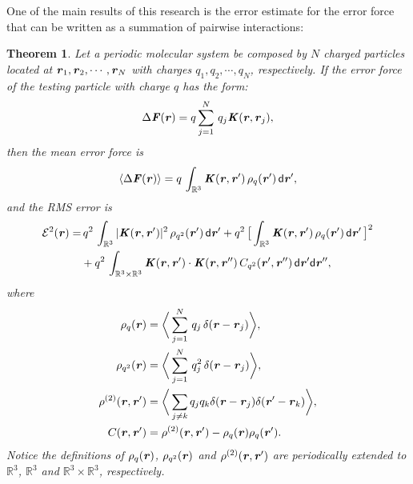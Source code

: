 \documentclass[aps,pre,preprint,unsortedaddress]{revtex4}
\renewcommand{\v}[1]{\textbf{\textit{#1}}}
\renewcommand{\d}[1]{\textsf{#1}}
\newtheorem{theorem}{Theorem}[section]
\begin{document}
One of the main results of this research is the error estimate for
the error force that can be written as a summation of
pairwise interactions:
\begin{theorem}\label{thm:tmp1}
  Let a periodic molecular system be composed by $N$ charged particles
  located at $\v r_1, \v r_2, \cdots, \v r_N$ with charges $q_1, q_2,
  \cdots, q_N$, respectively.
  If the error force of the testing particle with charge $q$ has the form:
  \begin{align}\label{eqn:thm-error-force}
    \Delta \v F(\v r) =
    q\sum_{j=1}^N\,q_j \v K(\v r, \v r_j),
  \end{align}
  then the mean error force is
  \begin{align}\label{eqn:thm-meanf}
    \langle\Delta\v F(\v r)\rangle
    =q\, \int_{\mathbb R^3}\v K (\v r,\v r')\,\rho_q(\v r')\,\d d\v r',
  \end{align}
  and the RMS error is
  \begin{align}\nonumber
    \mathcal E^2 (\v r) 
    = &\,
    q^2\,\int_{\mathbb R^3}\vert\v K(\v r,\v r')\vert^2\,\rho_{q^2} (\v r')\,\d d\v r' + 
    q^2\,
    \big[
    \int_{\mathbb R^3}\v K(\v r,\v r')\,\rho_{q}(\v r')\,\d d\v r'
    \,\big]^2
    \\\label{eqn:thm-error}
    &+
    q^2\,\int_{\mathbb R^3\times\mathbb R^3}
    \v K(\v r,\v r')\cdot
    \v K(\v r,\v r'')\,
    C_{q^2}(\v r', \v r'')\,
    \d d\v r'\d d\v r'',
  \end{align}
  where
  \begin{align}\label{eqn:def-rhoq}
    \rho_q(\v r)
    &= 
    \bigg\langle
    \sum_{j = 1}^N
    \,q_j\,\delta(\v r - \v r_j)
    \bigg\rangle,\\\label{eqn:def-rhoq2}
    \rho_{q^2}(\v r)
    &= 
    \bigg\langle
    \sum_{j = 1}^N
    \,q^2_j\,\delta(\v r - \v r_j)
    \bigg\rangle,\\\label{eqn:def-rho2}
    \rho^{(2)}(\v r, \v r')
    &= 
    \bigg\langle
    \sum_{j\neq k}
    q_jq_k\delta(\v r-\v r_j)\delta(\v r'-\v r_k)
    \bigg\rangle,\\\label{eqn:def-c}
    C(\v r, \v r')
    &=
    \rho^{(2)}(\v r, \v r')    
    - \rho_q(\v r)\rho_q(\v r').
  \end{align}
  Notice the definitions of $\rho_q(\v r)$, $\rho_{q^2}(\v r)$ and
  $\rho^{(2)}(\v r, \v r')$ are periodically extended to
  $\mathbb{R}^3$, $\mathbb{R}^3$ and $\mathbb{R}^3\times\mathbb R^3$,
  respectively.
\end{theorem}
\end{document}
